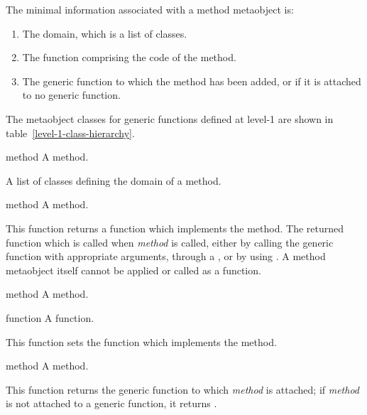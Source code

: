 \begin{optDefinition}
The minimal information associated with a method metaobject is:

\begin{enumerate}
    \item The domain, which is a list of classes.
    \item The function comprising the code of the method.
    \item The generic function to which the method has been added, or \nil{}\/ if
    it is attached to no generic function.
\end{enumerate}
%
The metaobject classes for generic functions defined at level-1 are
shown in table~\ref{level-1-class-hierarchy}.

%
\begin{arguments}
    \item[method] A method.
\end{arguments}
%
\result%
A list of classes defining the domain of a method.

%
\begin{arguments}
    \item[method] A method.
\end{arguments}
%
\result%
This function returns a function which implements the method.  The returned
function which is called when {\em method} is called, either by calling the
generic function with appropriate arguments, through a
, or by using .  A method
metaobject itself cannot be applied or called as a function.

%
\begin{arguments}
    \item[method] A method.
    \item[function] A function.
\end{arguments}
%
\result%
This function sets the function which implements the method.

%
\begin{arguments}
    \item[method] A method.
\end{arguments}
%
\result%
This function returns the generic function to which {\em method} is attached; if
{\em method} is not attached to a generic function, it returns \nil{}.
\end{optDefinition}

